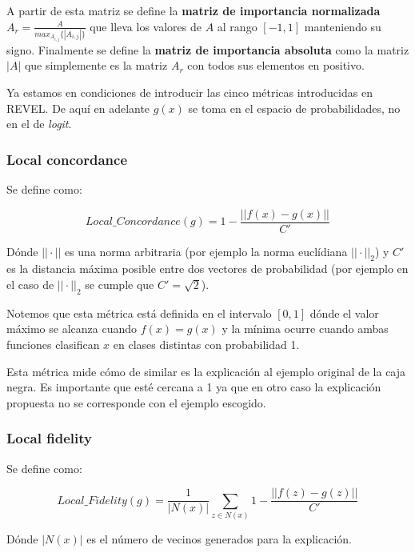 A partir de esta matriz se define la \textbf{matriz de importancia normalizada} $A_r=\frac{A}{ max_{A_{i,j}}\{|A_{i,j}|\} }$ que lleva los valores de $A$ al rango $[-1,1]$ manteniendo su signo. Finalmente se define la \textbf{matriz de importancia absoluta} como la matriz $|A|$ que simplemente es la matriz $A_r$ con todos sus elementos en positivo. 


Ya estamos en condiciones de introducir las cinco métricas introducidas en REVEL. De aquí en adelante $g(x)$ se toma en el espacio de probabilidades, no en el de \textit{logit}.

\subsubsection*{Local concordance}

Se define como:

\begin{equation}
Local\_Concordance(g) =  1 - \frac{||f(x)-g(x)||}{C'}
\end{equation}

Dónde $||\cdot||$ es una norma arbitraria (por ejemplo la norma euclídiana $||\cdot||_2$) y $C'$ es la distancia máxima posible entre dos vectores de probabilidad (por ejemplo en el caso de $||\cdot||_2$ se cumple que $C'=\sqrt{2}$). 

Notemos que esta métrica está definida en el intervalo $[0,1]$ dónde el valor máximo se alcanza cuando $f(x) = g(x)$ y la mínima ocurre cuando ambas funciones clasifican $x$ en clases distintas con probabilidad 1.

Esta métrica mide cómo de similar es la explicación al ejemplo original de la caja negra. Es importante que esté cercana a 1 ya que en otro caso la explicación propuesta no se corresponde con el ejemplo escogido.

\subsubsection*{Local fidelity}

Se define como:

\begin{equation}
 Local\_Fidelity(g) =  \frac{1}{|N(x)|} \sum_{z\in N(x)} 1 - \frac{||f(z)-g(z)||}{C'}
\end{equation}

Dónde $|N(x)|$ es el número de vecinos generados para la explicación. 

